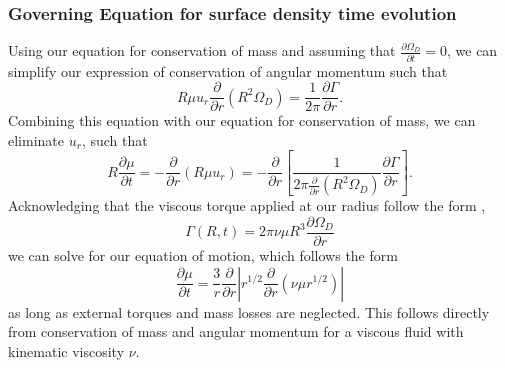\documentclass[aps,pra,twocolumn]{revtex4-1}
\begin{document}
\subsubsection{\label{section 2.1.3} Governing Equation for surface density time evolution}
Using our equation for conservation of mass and assuming that $\frac{\partial{\Omega_D}}{\partial t} = 0$, we can simplify our expression of conservation of angular momentum such that
\begin{equation}
R\mu u_r \frac{\partial}{\partial r} (R^2 \Omega_D) = \frac{1}{2\pi} \frac{\partial \Gamma}{\partial r}.
\end{equation}
Combining this equation with our equation for conservation of mass, we can eliminate $u_r$, such that
\begin{equation}
R \frac{\partial \mu}{\partial t} = -\frac{\partial}{\partial r}(R \mu u_r) = - \frac{\partial}{\partial r}\left[ \frac{1}{2\pi \frac{\partial}{\partial r}(R^2 \Omega_D)}\frac{\partial \Gamma}{\partial r} \right].
\end{equation}
Acknowledging that the viscous torque applied at our radius follow the form \cite{king2002},
\begin{equation}
\Gamma(R, t) = 2\pi  \nu \mu R^3 \frac{\partial \Omega_D}{\partial r} \label{torque}
\end{equation}
we can solve for our equation of motion, which follows the form 
\begin{equation}
\frac{\partial \mu}{\partial t} = \frac{3}{r} \frac{\partial}{\partial r} \left| r^{1/2}\frac{\partial}{\partial r}\left( \nu \mu r^{1/2} \right) \right|
\end{equation}
as long as external torques and mass losses are neglected\cite{king2002, armitage2011}.  This follows directly from conservation of mass and angular momentum for a viscous fluid with kinematic viscosity $\nu$.
\end{document}
